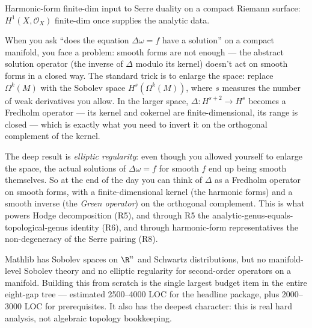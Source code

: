 \begin{lemma}
\label{lem:serre-harmonic-finite-dim-substantive}
Harmonic-form finite-dim input to Serre duality on a compact
Riemann surface: $H^{1}(X, \mathcal{O}_{X})$ finite-dim once
 supplies the analytic data.
\leanok
\end{lemma}

\begin{layman}
When you ask ``does the equation \(\Delta\omega = f\) have a solution''
on a compact manifold, you face a problem: smooth forms are not
enough --- the abstract solution operator (the inverse of \(\Delta\)
modulo its kernel) doesn't act on smooth forms in a closed way.  The
standard trick is to enlarge the space: replace \(\Omega^{k}(M)\) with
the Sobolev space \(H^{s}(\Omega^{k}(M))\), where \(s\) measures the
number of weak derivatives you allow.  In the larger space, \(\Delta :
H^{s+2} \to H^{s}\) becomes a Fredholm operator --- its kernel and
cokernel are finite-dimensional, its range is closed --- which is
exactly what you need to invert it on the orthogonal complement of the
kernel.

The deep result is \emph{elliptic regularity}: even though you allowed
yourself to enlarge the space, the actual solutions of \(\Delta\omega
= f\) for smooth \(f\) end up being smooth themselves.  So at the end
of the day you can think of \(\Delta\) as a Fredholm operator on
smooth forms, with a finite-dimensional kernel (the harmonic forms)
and a smooth inverse (the \emph{Green operator}) on the orthogonal
complement.  This is what powers Hodge decomposition (R5), and through
R5 the analytic-genus-equals-topological-genus identity (R6), and
through harmonic-form representatives the non-degeneracy of the Serre
pairing (R8).

Mathlib has Sobolev spaces on \(\R^{n}\) and Schwartz distributions,
but no manifold-level Sobolev theory and no elliptic regularity for
second-order operators on a manifold.  Building this from scratch is
the single largest budget item in the entire eight-gap tree ---
estimated 2500--4000 LOC for the headline package, plus 2000--3000 LOC
for prerequisites.  It also has the deepest character: this is real
hard analysis, not algebraic topology bookkeeping.
\end{layman}

